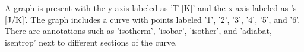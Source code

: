 A graph is present with the y-axis labeled as 'T [K]' and the x-axis labeled as 's [J/K]'. The graph includes a curve with points labeled '1', '2', '3', '4', '5', and '6'. There are annotations such as 'isotherm', 'isobar', 'isother', and 'adiabat, isentrop' next to different sections of the curve.